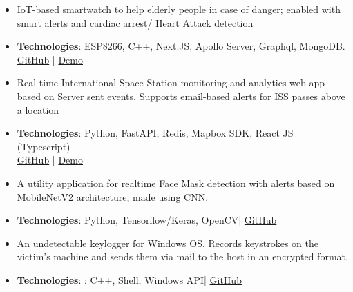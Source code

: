 
\begin{itemize}
\item IoT-based smartwatch to help elderly people in case of danger; enabled with smart alerts and cardiac arrest/
Heart Attack detection
\item \textbf{Technologies}: ESP8266, C++, Next.JS, Apollo Server, Graphql, MongoDB.\\
\textcolor{blue}{\href{https://github.com/shaiq-dev/PanicAlarm}{GitHub}} | \textcolor{blue}{\href{https://panicalarm.vercel.app}{Demo}}
\end{itemize}
\smallskip
\smallskip

\begin{itemize}
\item Real-time International Space Station monitoring and analytics web app based on Server sent events. Supports email-based alerts for ISS passes above a location
\item \textbf{Technologies}: Python, FastAPI, Redis, Mapbox SDK, React JS (Typescript)\\
\textcolor{blue}{\href{https://github.com/shaiq-dev/server4issnow}{GitHub}} | \textcolor{blue}{\href{https://issnow.netlify.app}{Demo}}
\end{itemize}
\smallskip
\smallskip

\begin{itemize}
\item A utility application for realtime Face Mask detection with alerts based on MobileNetV2 architecture, made using CNN.
\item \textbf{Technologies}: Python, Tensorflow/Keras, OpenCV\hspace{2mm}|\hspace{2mm}
\textcolor{blue}{\href{https://github.com/shaiq-dev/FaceMaskMonitor}{GitHub}}
\end{itemize}
\smallskip
\smallskip

\begin{itemize}
\item An undetectable keylogger for Windows OS. Records keystrokes on the victim’s machine and sends them via mail to the host in an encrypted format.
\item \textbf{Technologies}: : C++, Shell, Windows API\hspace{2mm}|\hspace{2mm}
\textcolor{blue}{\href{https://github.com/shaiq-dev/Klint}{GitHub}}
\end{itemize}
\smallskip

